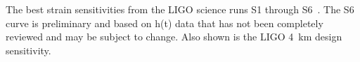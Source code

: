 \label{figure:LIGOstrains}
The best strain sensitivities from the LIGO science runs S1
through S6~\cite{LIGOcurves}. The S6 curve is preliminary and based on h(t) data
that has not been completely reviewed and may be subject to change. Also shown
is the LIGO 4~km design sensitivity.
